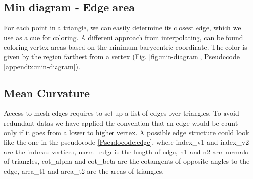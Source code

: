 \subsection{Min diagram - Edge area} \label{section:min-diagram}
For each point in a triangle, we can easily determine its closest edge, which we use as a cue for coloring.
A different approach from interpolating, can be found coloring vertex areas based on the minimum barycentric coordinate.
The color is given by the region farthest from a vertex (Fig. \ref{fig:min-diagram}, Pseudocode \ref{appendix:min-diagram}).

\subsection{Mean Curvature} \label{section:edge-struct} \label{section:mc-curvature}
Access to mesh edges requires to set up a list of edges over triangles. To avoid redundant datas we have applied the convention that an edge would be count only if it goes from a lower to higher vertex. A possible edge structure could look like the one in the pseudocode \ref{Pseudocode:edge}, where index\_v1 and index\_v2 are the indexes vertices, norm\_edge is the length of edge, n1 and n2 are normals of triangles, cot\_alpha and cot\_beta are the cotangents of opposite angles to the edge, area\_t1 and area\_t2 are the areas of triangles.

